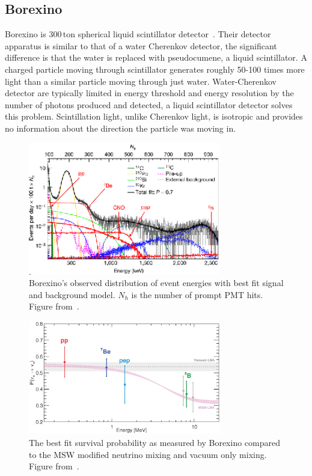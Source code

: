 \subsection{Borexino}
Borexino is 300\,ton spherical liquid scintillator detector~\citep{borexino_tdr}. Their detector
apparatus is similar to that of a water Cherenkov detector, the significant difference
is that the water is replaced with pseudocumene, a liquid scintillator.
A charged particle moving through scintillator generates roughly 50-100 times
more light than a similar particle moving through just water.
Water-Cherenkov detector are typically limited in energy threshold
and energy resolution by the number of photons produced and detected, a liquid scintillator
detector solves this problem.  Scintillation light, unlike Cherenkov light,
is isotropic and provides no information about the direction the particle
was moving in.
\begin{figure}[htbp]
    \centering
    \includegraphics[width=0.75\textwidth]{borexino_spectrum}
    \caption[Borexino Spectrum] {Borexino's observed distribution of event energies with best fit
    signal and background model.
    $N_{h}$ is the number of prompt PMT hits.  Figure from~\citep{borexino_nature}.} %
\label{fig:borexino_spectrum}
\end{figure}
\begin{figure}[htbp]
    \centering
    \includegraphics[width=0.75\textwidth]{borexino_pee}
    \caption[Borexino Survival Probability] {The best fit survival probability
    as measured by Borexino compared to the MSW modified neutrino mixing
    and vacuum only mixing. Figure from~\citep{borexino_nature}.}
\label{fig:borexino_pee}
\end{figure}

